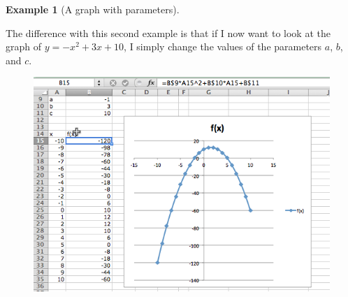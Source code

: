 \documentclass[10pt,]{book}
\theoremstyle{plain}
\theoremstyle{definition}
\newtheorem{example}[theorem]{Example}
\theoremstyle{definition}
\begin{document}
\begin{example}[A graph with parameters]
\begin{figure}
\end{figure}
\par
The difference with this second example is that if I now want to look at the graph of \(y = -x^2 + 3 x + 10\), I simply change the values of the parameters \(a\), \(b\), and \(c\).%
\leavevmode%
\begin{figure}
\centering
\includegraphics[width=0.8\linewidth]{images/sec1-4-7.png}
\end{figure}
\end{example}
\end{document}
